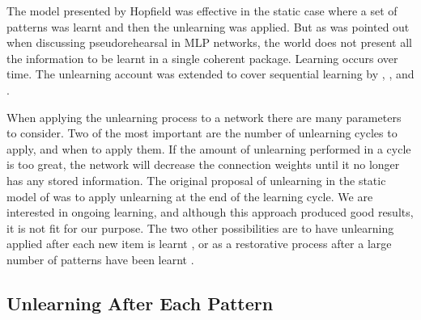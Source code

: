 The model presented by Hopfield was effective in the static case where a set of patterns was learnt and then the unlearning was applied.  But as was pointed out when discussing pseudorehearsal in MLP networks, the world does not present all the information to be learnt in a single coherent package.  Learning occurs over time.  The unlearning account was extended to cover sequential learning by \citet{Wimbauer94}, \citet{Christos96}, and \citet{vanHemmen1997}. 

When applying the unlearning process to a network there are many parameters to consider.  Two of the most important are the number of unlearning cycles to apply, and when to apply them.  If the amount of unlearning performed in a cycle is too great, the network will decrease the connection weights until it no longer has any stored information.  The original proposal of unlearning in the static model of \citet{Hopfield83} was to apply unlearning at the end of the learning cycle.  We are interested in ongoing learning, and although this approach produced good results, it is not fit for our purpose.  The two other possibilities are to have unlearning applied after each new item is learnt \citep{Christos96}, or as a restorative process after a large number of patterns have been learnt \citep{vanHemmen1997}.

\subsection{Unlearning After Each Pattern}
\label{sec:ChristosUnlearning}

